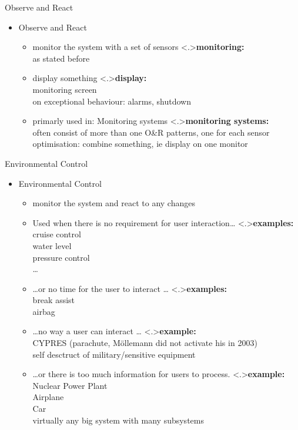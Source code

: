 \documentclass[ngerman={babel}, utf8, bigger, xcolor={table,dvipsnames}, ompress, hyperref={bookmarks,colorlinks}]{beamer}
\begin{document}
\begin{frame}{Observe and React}
	\begin{itemize}
		\item Observe and React
		\begin{itemize}
			\item monitor the system with a set of sensors
			\note<.>{\textbf{monitoring:}\\ as stated before}
			\item display something
			\note<.>{\textbf{display:}\\ monitoring screen \\ on exceptional behaviour: alarms, shutdown\\ }
			\item primarly used in: Monitoring systems
			\note<.>{\textbf{monitoring systems:}\\ often consist of more than one O\&R patterns, one for each sensor \\ optimisation: combine something, ie display on one monitor}
		\end{itemize}
	\end{itemize}
\end{frame}

\begin{frame}{Environmental Control}
	\begin{itemize}
		\item Environmental Control
		\begin{itemize}
			\item monitor the system and react to any changes
			\item Used when there is no requirement for user interaction\dots{}
			\note<.>{\textbf{examples:}\\ cruise control \\ water level \\ pressure control \\ \dots }
			\item \dots or no time for the user to interact \dots
			\note<.>{\textbf{examples:}\\ break assist \\ airbag}
			\item \dots no way a user can interact \dots{}
			\note<.>{\textbf{example:}\\ CYPRES {\tiny (parachute, Möllemann did not activate his in 2003)} \\ self desctruct of military/sensitive equipment}
			\item \dots or there is too much information for users to process.
			\note<.>{\textbf{example:}\\ Nuclear Power Plant \\ Airplane \\ Car \\ virtually any big system with many subsystems}
		\end{itemize}
	\end{itemize}
\end{frame}
\end{document}
